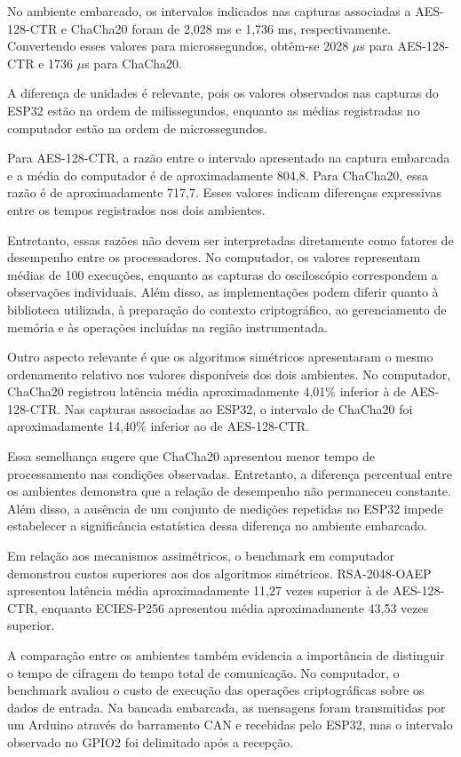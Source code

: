 No ambiente embarcado, os intervalos indicados nas capturas associadas a AES-128-CTR e ChaCha20 foram de 2,028 ms e 1,736 ms, respectivamente. Convertendo esses valores para microssegundos, obtêm-se 2028 $\mu$s para AES-128-CTR e 1736 $\mu$s para ChaCha20.

A diferença de unidades é relevante, pois os valores observados nas capturas do ESP32 estão na ordem de milissegundos, enquanto as médias registradas no computador estão na ordem de microssegundos.

Para AES-128-CTR, a razão entre o intervalo apresentado na captura embarcada e a média do computador é de aproximadamente 804,8. Para ChaCha20, essa razão é de aproximadamente 717,7. Esses valores indicam diferenças expressivas entre os tempos registrados nos dois ambientes.

Entretanto, essas razões não devem ser interpretadas diretamente como fatores de desempenho entre os processadores. No computador, os valores representam médias de 100 execuções, enquanto as capturas do osciloscópio correspondem a observações individuais. Além disso, as implementações podem diferir quanto à biblioteca utilizada, à preparação do contexto criptográfico, ao gerenciamento de memória e às operações incluídas na região instrumentada.

Outro aspecto relevante é que os algoritmos simétricos apresentaram o mesmo ordenamento relativo nos valores disponíveis dos dois ambientes. No computador, ChaCha20 registrou latência média aproximadamente 4,01\% inferior à de AES-128-CTR. Nas capturas associadas ao ESP32, o intervalo de ChaCha20 foi aproximadamente 14,40\% inferior ao de AES-128-CTR.

Essa semelhança sugere que ChaCha20 apresentou menor tempo de processamento nas condições observadas. Entretanto, a diferença percentual entre os ambientes demonstra que a relação de desempenho não permaneceu constante. Além disso, a ausência de um conjunto de medições repetidas no ESP32 impede estabelecer a significância estatística dessa diferença no ambiente embarcado.

Em relação aos mecanismos assimétricos, o benchmark em computador demonstrou custos superiores aos dos algoritmos simétricos. RSA-2048-OAEP apresentou latência média aproximadamente 11,27 vezes superior à de AES-128-CTR, enquanto ECIES-P256 apresentou média aproximadamente 43,53 vezes superior.

A comparação entre os ambientes também evidencia a importância de distinguir o tempo de cifragem do tempo total de comunicação. No computador, o benchmark avaliou o custo de execução das operações criptográficas sobre os dados de entrada. Na bancada embarcada, as mensagens foram transmitidas por um Arduino através do barramento CAN e recebidas pelo ESP32, mas o intervalo observado no GPIO2 foi delimitado após a recepção.

